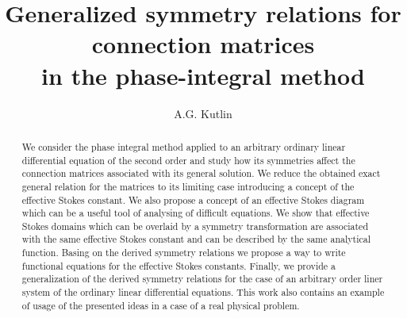 \documentclass[atmp]{ipart_v1}
\begin{document}
\title[Symmetry relations for connection matrices]
{Generalized symmetry relations for connection matrices \\ in the phase-integral method}
\author[A.G. Kutlin]{A.G. Kutlin}

\begin{abstract}
We consider the phase integral method applied to
an arbitrary ordinary linear differential equation of the second order and study 
how its symmetries affect the connection matrices associated with its general solution.
We reduce the obtained exact general relation for the matrices to its limiting case introducing
a concept of the effective Stokes constant. We also propose a concept of an effective Stokes 
diagram which can be a useful tool of analysing of difficult equations. We show that effective 
Stokes domains which can be overlaid by a symmetry transformation are associated with the same 
effective Stokes constant and can be described by the same analytical function. Basing on
the derived symmetry relations we propose a way to write functional equations for 
the effective Stokes constants. Finally, we provide a generalization of the derived symmetry 
relations for the case of an arbitrary order liner system of the ordinary linear differential equations. 
This work also contains an example of usage of the presented ideas in a case of a real physical problem.
\end{abstract}

\maketitle
\end{document}
